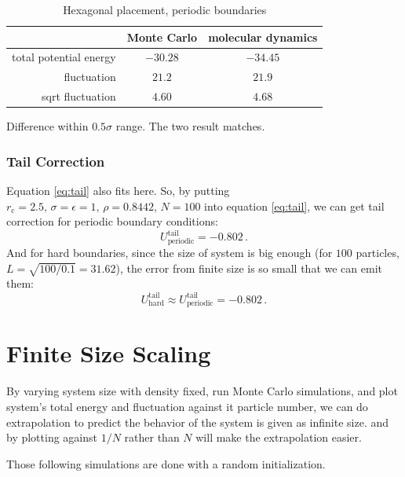 \documentclass[UTF8,a4paper]{article}
\begin{document}
\begin{table}[H]
	\centering
	\caption{Hexagonal placement, periodic boundaries}
	\begin{tabular}{rcc}
		\toprule
		\toprule
		                       & Monte Carlo & molecular dynamics \\ \midrule
		total potential energy & $-30.28$    & $-34.45$           \\
		fluctuation            & $21.2$      & $21.9$             \\
		sqrt fluctuation       & $4.60$      & $4.68$             \\
		\bottomrule
	\end{tabular}%
	\label{tab:hex_hard_2}%
\end{table}%
Difference within $0.5\sigma$ range. The two result matches.
\subsubsection{Tail Correction}
Equation \eqref{eq:tail} also fits here. So, by putting $r_\text{c} = 2.5, \, \sigma = \epsilon = 1, \,\rho = 0.8442, \,N = 100$ into equation \eqref{eq:tail}, we can
get tail correction for periodic boundary conditions:
\begin{equation}
	U^{\text{tail}}_{\text{periodic}} = -0.802\,.
\end{equation}
And for hard boundaries, since the size of system is big enough (for $100$ particles, $L = \sqrt{100/0.1} = 31.62$), the error from finite size is so small that we can
emit them:
\begin{equation}
	U^{\text{tail}}_{\text{hard}} \approx U^{\text{tail}}_{\text{periodic}} = -0.802\,.
\end{equation}

\section{Finite Size Scaling}
By varying system size with density fixed, run Monte Carlo simulations, and plot system's total energy and fluctuation against it particle number, we can
do extrapolation to predict the behavior of the system is given as infinite size. and by plotting against $1/N$ rather than $N$ will make the extrapolation
easier.

Those following simulations are done with a random initialization.
\end{document}
